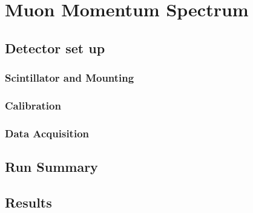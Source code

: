 \section{Muon Momentum Spectrum} %
\label{sec:muon_momentum_spectrum}
\subsection{Detector set up} %
\label{sub:mom_detector_set_up}
\subsubsection{Scintillator and Mounting} %
\label{ssub:mom_scintillator_mounting}

\subsubsection{Calibration} %
\label{ssub:mom_calibration}

\subsubsection{Data Acquisition} %
\label{ssub:mom_data_acquisition}

\subsection{Run Summary} %
\label{sub:mom_run_summary}

\subsection{Results} %
\label{sub:mom_results}

